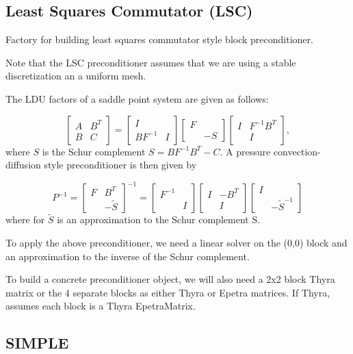 \subsection{Least Squares Commutator (LSC)}
Factory for building least squares commutator style block
preconditioner.  

Note that the LSC preconditioner assumes that we are using
a stable discretization an a uniform mesh.

The LDU factors of a saddle point system are given as follows:

\begin{equation}
  \left[ \begin{array}{cc} A & B^T \\ B & C \end{array} \right]
     = \left[ \begin{array}{cc} I & \\ BF^{-1} & I \end{array} \right]
       \left[ \begin{array}{cc} F & \\  & -S \end{array} \right]
       \left[ \begin{array}{cc} I & F^{-1} B^T  \\  & I \end{array} \right],
\end{equation}
where $S$ is the Schur complement $S = B F^{-1} B^T - C$.
A pressure convection-diffusion style preconditioner is then given by
     
\begin{equation}
     P^{-1} =
       \left[ \begin{array}{cc} F & B^T \\ & -\tilde S \end{array} \right]^{-1}
       = 
       \left[ \begin{array}{cc} F^{-1} &  \\  & I \end{array} \right]
       \left[ \begin{array}{cc} I & -B^T \\  & I \end{array} \right]
       \left[ \begin{array}{cc} I &  \\  & -\tilde S^{-1} \end{array} \right]
\end{equation}
where for $\tilde S$ is an approximation to the Schur complement S.

To apply the above preconditioner, we need a linear solver on the
(0,0) block and an approximation to the inverse of the Schur
complement.

To build a concrete preconditioner object, we will also need a 2x2
block Thyra matrix or the 4 separate blocks as either Thyra or Epetra
matrices.  If Thyra, assumes each block is a Thyra EpetraMatrix.


\subsection{SIMPLE}

